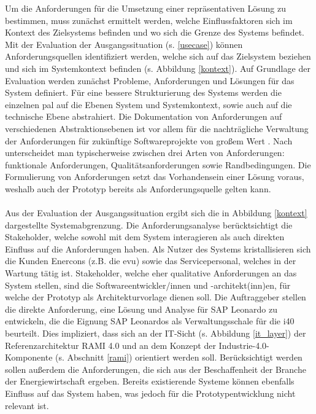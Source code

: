 Um die Anforderungen für die Umsetzung einer repräsentativen Lösung zu bestimmen, muss zunächst ermittelt werden, welche Einflussfaktoren sich im Kontext des Zielsystems befinden und wo sich die Grenze des Systems befindet. Mit der Evaluation der Ausgangssituation (s. \ref{usecase}) können Anforderungsquellen identifiziert werden, welche sich auf das Zielsystem beziehen und sich im Systemkontext befinden (s. Abbildung \ref{kontext}). Auf Grundlage der Evaluation werden zunächst Probleme, Anforderungen und Lösungen für das System definiert. Für eine bessere Strukturierung des Systems werden die einzelnen \ac{pal} auf die Ebenen System und Systemkontext, sowie auch auf die technische Ebene abstrahiert. Die Dokumentation von Anforderungen auf verschiedenen Abstraktionsebenen ist vor allem für die nachträgliche Verwaltung der Anforderungen für zukünftige Softwareprojekte von großem Wert \citep{Lauenroth2016}. Nach \citet{IREB2017} unterscheidet man typischerweise zwischen drei Arten von Anforderungen: funktionale Anforderungen, Qualitätsanforderungen sowie Randbedingungen.
Die Formulierung von Anforderungen setzt das Vorhandensein einer Lösung voraus, weshalb auch der Prototyp bereits als Anforderungsquelle gelten kann.
\\\\Aus der Evaluation der Ausgangssituation ergibt sich die in Abbildung \ref{kontext} dargestellte Systemabgrenzung. Die Anforderungsanalyse berücktsichtigt die Stakeholder, welche sowohl mit dem System interagieren als auch direkten Einfluss auf die Anforderungen haben. Als Nutzer des Systems kristallisieren sich die Kunden Enercons (z.B. die \ac{evu}) sowie das Servicepersonal, welches in der Wartung tätig ist. Stakeholder, welche eher qualitative Anforderungen an das System stellen, sind die Softwareentwickler/innen und -architekt(inn)en, für welche der Prototyp als Architekturvorlage dienen soll. Die Auftraggeber stellen die direkte Anforderung, eine Lösung und Analyse für SAP Leonardo zu entwickeln, die die Eignung SAP Leonardos als Verwaltungsschale für die \ac{i40} beurteilt. Dies impliziert, dass sich an der IT-Sicht (s. Abbildung \ref{it_layer}) der Referenzarchitektur RAMI 4.0 und an dem Konzept der Industrie-4.0-Komponente (s. Abschnitt \ref{rami}) orientiert werden soll. Berücksichtigt werden sollen außerdem die Anforderungen, die sich aus der Beschaffenheit der Branche der Energiewirtschaft ergeben. Bereits existierende Systeme können ebenfalls Einfluss auf das System haben, was jedoch für die Prototypentwicklung nicht relevant ist.


